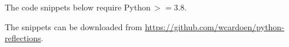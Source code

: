 \documentclass[10pt]{article}
\begin{document}
\title{}
\author{Wim R.M. Cardoen \\ Email: \$(prefix)[at]gmail[dot]com \\ where \\ prefix='wcardoen' }
\date{\today}
\maketitle
\thispagestyle{empty}
\pagestyle{plain}
\setcounter{page}{1}
\renewcommand \thesection{\Roman{section}} 

The code snippets below require Python\,$>=3.8$. 

The snippets can be downloaded from 
\href{https://github.com/wcardoen/python-reflections.git}{https://github.com/wcardoen/python-reflections}.
\end{document}
